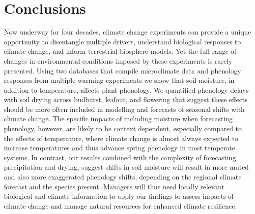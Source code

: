 \documentclass{article}
\begin{document}
\section* {Conclusions}
Now underway for four decades, climate change experiments \citep[e.g.,][]{tamaki1981,carlson1982,melillo2017} can provide a unique opportunity to disentangle multiple drivers, understand biological responses to climate change, and inform terrestrial biosphere models. Yet the full range of changes in environmental conditions imposed by these experiments is rarely presented. Using two databases that compile microclimate data and phenology responses from multiple warming experiments we show that soil moisture, in addition to temperature, affects plant phenology. We quantified phenology delays with soil drying across budburst, leafout, and flowering that suggest these effects should be more often included in modelling and forecasts of seasonal shifts with climate change.  
The specific impacts of including moisture when forecasting phenology, however, are likely to be context dependent, especially compared to the effects of temperature, where climate change is almost always expected to increase temperatures and thus advance spring phenology in most temperate systems. In contrast, our results combined with the complexity of forecasting precipitation and drying, suggest shifts in soil moisture will result in more muted and also more exaggerated phenology shifts, depending on the regional climate forecast and the species present. Managers will thus need locally relevant biological and climate information to apply our findings to assess impacts of climate change and manage natural resources for enhanced climate resilience.
\end{document}
